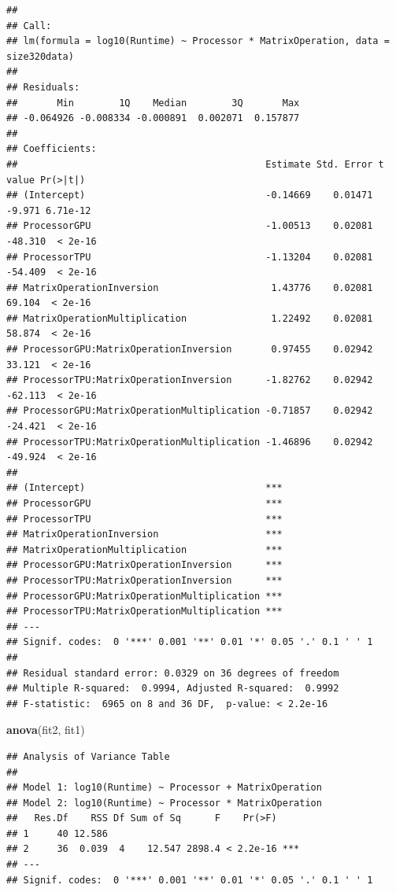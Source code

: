 \documentclass[
]{article}
\newenvironment{Shaded}{\begin{snugshade}}{\end{snugshade}}
\newcommand{\KeywordTok}[1]{\textcolor[rgb]{0.13,0.29,0.53}{\textbf{#1}}}
\newcommand{\NormalTok}[1]{#1}
\begin{document}
\begin{verbatim}
## 
## Call:
## lm(formula = log10(Runtime) ~ Processor * MatrixOperation, data = size320data)
## 
## Residuals:
##       Min        1Q    Median        3Q       Max 
## -0.064926 -0.008334 -0.000891  0.002071  0.157877 
## 
## Coefficients:
##                                            Estimate Std. Error t value Pr(>|t|)
## (Intercept)                                -0.14669    0.01471  -9.971 6.71e-12
## ProcessorGPU                               -1.00513    0.02081 -48.310  < 2e-16
## ProcessorTPU                               -1.13204    0.02081 -54.409  < 2e-16
## MatrixOperationInversion                    1.43776    0.02081  69.104  < 2e-16
## MatrixOperationMultiplication               1.22492    0.02081  58.874  < 2e-16
## ProcessorGPU:MatrixOperationInversion       0.97455    0.02942  33.121  < 2e-16
## ProcessorTPU:MatrixOperationInversion      -1.82762    0.02942 -62.113  < 2e-16
## ProcessorGPU:MatrixOperationMultiplication -0.71857    0.02942 -24.421  < 2e-16
## ProcessorTPU:MatrixOperationMultiplication -1.46896    0.02942 -49.924  < 2e-16
##                                               
## (Intercept)                                ***
## ProcessorGPU                               ***
## ProcessorTPU                               ***
## MatrixOperationInversion                   ***
## MatrixOperationMultiplication              ***
## ProcessorGPU:MatrixOperationInversion      ***
## ProcessorTPU:MatrixOperationInversion      ***
## ProcessorGPU:MatrixOperationMultiplication ***
## ProcessorTPU:MatrixOperationMultiplication ***
## ---
## Signif. codes:  0 '***' 0.001 '**' 0.01 '*' 0.05 '.' 0.1 ' ' 1
## 
## Residual standard error: 0.0329 on 36 degrees of freedom
## Multiple R-squared:  0.9994, Adjusted R-squared:  0.9992 
## F-statistic:  6965 on 8 and 36 DF,  p-value: < 2.2e-16
\end{verbatim}

\begin{Shaded}
\begin{Highlighting}[]
\KeywordTok{anova}\NormalTok{(fit2, fit1)}
\end{Highlighting}
\end{Shaded}

\begin{verbatim}
## Analysis of Variance Table
## 
## Model 1: log10(Runtime) ~ Processor + MatrixOperation
## Model 2: log10(Runtime) ~ Processor * MatrixOperation
##   Res.Df    RSS Df Sum of Sq      F    Pr(>F)    
## 1     40 12.586                                  
## 2     36  0.039  4    12.547 2898.4 < 2.2e-16 ***
## ---
## Signif. codes:  0 '***' 0.001 '**' 0.01 '*' 0.05 '.' 0.1 ' ' 1
\end{verbatim}
\end{document}
